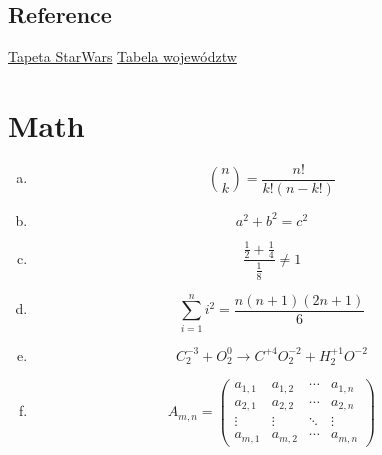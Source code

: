 \documentclass{article}
\begin{document}
\subsection{Reference}
\hyperref[fig:StarWars]{Tapeta StarWars}
\newline
\hyperref[table:1]{Tabela województw}
\newline

\newpage
\section{Math}
\begin{enumerate}[a)]
    \item 
        \begin{equation}
            {n \choose k} = \frac{n!}{k!(n - k!)}
        \end{equation}
        
        \item
        \begin{equation}
            a^2 + b^2 = c^2
        \end{equation}
        
        \item
        \begin{equation}
            \frac{\frac{1}{2} + \frac{1}{4}}{\frac{1}{8}}\neq 1
        \end{equation}

        \item
        \begin{equation}
            \sum_{i=1}^{n} i^2 = \frac{n(n + 1)(2n + 1)}{6}
        \end{equation}
        
        \item
        \begin{equation}
            C_2^{-3} + O_2^{0} \rightarrow C^{+4}O_2^{-2} + H_2^{+1}O^{-2}
        \end{equation}
        
        \item
        \begin{equation}
            A_{m,n} = 
            \begin{pmatrix}
                    a_{1,1} & a_{1,2} & \cdots & a_{1,n} \\
                    a_{2,1} & a_{2,2} & \cdots & a_{2,n} \\
                    \vdots & \vdots & \ddots & \vdots \\
                    a_{m,1} & a_{m,2} & \cdots & a_{m,n}
            \end{pmatrix}
        \end{equation}
\end{enumerate}
\end{document}

